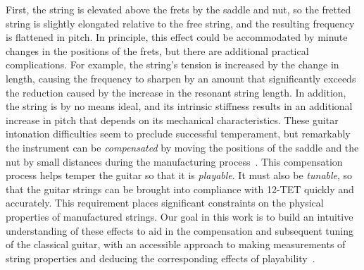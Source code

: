 First, the string is elevated above the frets by the saddle and nut, so the fretted string is slightly elongated relative to the free string, and the resulting frequency is flattened in pitch. In principle, this effect could be accommodated by minute changes in the positions of the frets, but there are additional practical complications. For example, the string's tension is increased by the change in length, causing the frequency to sharpen by an amount that significantly exceeds the reduction caused by the increase in the resonant string length. In addition, the string is by no means ideal, and its intrinsic stiffness results in an additional increase in pitch that depends on its mechanical characteristics. These guitar intonation difficulties seem to preclude successful temperament, but remarkably the instrument can be \emph{compensated} by moving the positions of the saddle and the nut by small distances during the manufacturing process~\cite{ref:byersgal,ref:byers1996cgi,ref:varieschi2010icf}. This compensation process helps temper the guitar so that it is \emph{playable}. It must also be \emph{tunable}, so that the guitar strings can be brought into compliance with 12-TET quickly and accurately. This requirement places significant constraints on the physical properties of manufactured strings. Our goal in this work is to build an intuitive understanding of these effects to aid in the compensation and subsequent tuning of the classical guitar, with an accessible approach to making measurements of string properties and deducing the corresponding effects of playability~\cite{ref:erkut2000epe,ref:noll2014gim,ref:dostal2020srw}.

